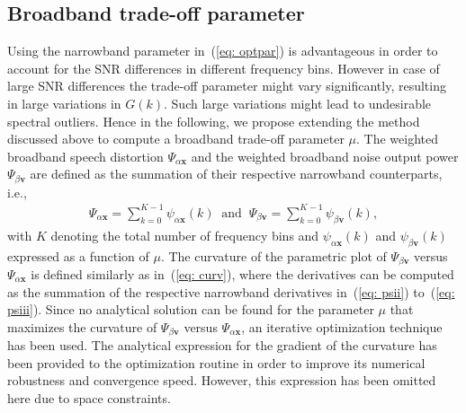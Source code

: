 \documentclass{article}
\begin{document}
\subsection{Broadband trade-off parameter}
\label{sec: broad}
Using the narrowband parameter in~(\ref{eq: optpar}) is advantageous in order to account for the SNR differences in different frequency bins.
However in case of large SNR differences the trade-off parameter might vary significantly, resulting in large variations in $G(k)$.
Such large variations might lead to undesirable spectral outliers.
Hence in the following, we propose extending the method discussed above to compute a broadband trade-off parameter $\mu$. \newline
The weighted broadband speech distortion $\Psi_{\alpha \mathbf{x}}$ and the weighted broadband noise output power $\Psi_{\beta \mathbf{v}}$ are defined as the summation of their respective narrowband counterparts, i.e.,
\begin{align}
\Psi_{\alpha\mathbf{x}} = \sum_{k = 0}^{K-1} \psi_{\alpha \mathbf{x}}(k) \; \; \text{and} \; \; \Psi_{\beta\mathbf{v}} = \sum_{k = 0}^{K-1} \psi_{\beta\mathbf{v}}(k),
\end{align}
with $K$ denoting the total number of frequency bins and $\psi_{\alpha\mathbf{x}}(k)$ and $\psi_{\beta\mathbf{v}}(k)$ expressed as a function of $\mu$.
The curvature of the parametric plot of $\Psi_{\beta\mathbf{v}}$ versus $\Psi_{\alpha\mathbf{x}}$ is defined similarly as in~(\ref{eq: curv}), where the derivatives can be computed as the summation of the respective narrowband derivatives in~(\ref{eq: psii}) to~(\ref{eq: psiii}). 
Since no analytical solution can be found for the parameter $\mu$ that maximizes the curvature of $\Psi_{\beta\mathbf{v}}$ versus $\Psi_{\alpha\mathbf{x}}$, an iterative optimization technique has been used.
The analytical expression for the gradient of the curvature has been provided to the optimization routine in order to improve its numerical robustness and convergence speed.
However, this expression has been omitted here due to space constraints. 
\end{document}
